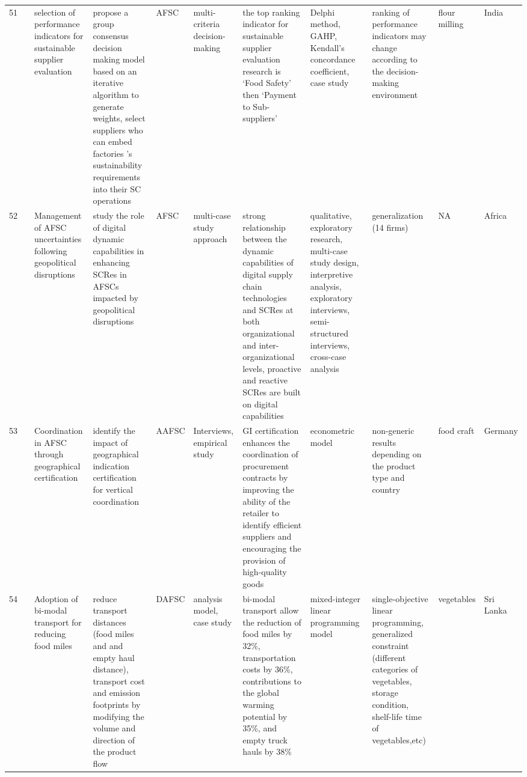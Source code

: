 \documentclass[a4paper,10pt]{article}
\begin{document}
\begin{landscape}
\begin{small}
\begin{longtable}{p{0.5cm} p{2cm} p{2.5cm} p{4cm} p{1cm} p{2.5cm} p{5.5cm} p{2.5cm} p{2.5cm} p{1.8cm} p{1.5cm}}
51 & \textcite{Sharma23} & selection of performance indicators for sustainable supplier evaluation& propose a group consensus decision making model based on an iterative algorithm to generate weights, select suppliers who can embed factories ’s sustainability requirements into their SC operations& AFSC & multi-criteria decision-making & the top ranking indicator for sustainable supplier evaluation research is ‘Food Safety’ then ‘Payment to Sub-suppliers’& Delphi method, GAHP, Kendall’s concordance coefficient, case study &  ranking of performance indicators may change according to the decision-making environment &flour milling & India \\
52 & \textcite{belhadi24} & Management of AFSC uncertainties following geopolitical disruptions& study the role of digital dynamic capabilities in enhancing SCRes in  AFSCs impacted by geopolitical disruptions& AFSC & multi-case study approach & strong relationship between the dynamic capabilities of digital supply chain technologies and SCRes at both organizational and inter-organizational levels, proactive and reactive SCRes are built on digital capabilities & qualitative, exploratory research, multi-case study design, interpretive analysis, exploratory interviews, semi-structured interviews, cross-case analysis& generalization (14 firms)& NA& Africa  \\
53 & \textcite{Rackl26} &  Coordination in AFSC through geographical certification&identify the impact of geographical indication certification for vertical coordination & AAFSC&Interviews, empirical study &GI certification enhances the coordination of procurement contracts by improving the ability of the retailer to identify efficient suppliers and encouraging the provision of high-quality goods& econometric model & non-generic results  depending on the product type and country & food craft & Germany  \\
54 & \textcite{Chandrasiri29} &Adoption of bi-modal transport for reducing food miles & reduce transport distances (food miles and and empty haul distance), transport cost and emission footprints by modifying the volume and direction of the product flow & DAFSC & analysis model, case study & bi-modal transport allow the reduction of food miles by 32\%, transportation costs by 36\%, contributions to the global warming potential by 35\%, and empty truck hauls by 38\% & mixed-integer linear programming model & single-objective linear programming, generalized constraint (different categories of vegetables, storage condition, shelf-life time  of vegetables,etc) & vegetables& Sri Lanka \\

\end{longtable}
\end{small}
\end{landscape}
\end{document}
